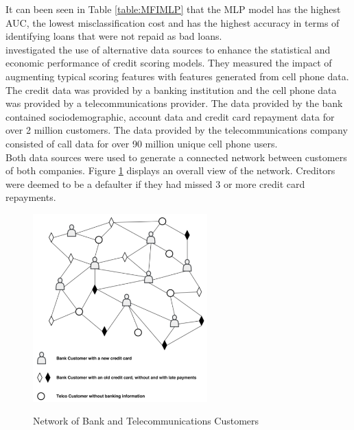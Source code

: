 \vspace{15pt}

It can been seen in Table \ref{table:MFIMLP} that the MLP model has the highest AUC, the lowest misclassification cost and has the highest accuracy in terms of identifying loans that were not repaid as bad loans. \\

\textcite{BigDataMicroFiance} investigated the use of alternative
data sources to enhance the statistical and economic  performance of credit scoring models. They measured the impact of augmenting typical scoring features with features generated from cell phone data. The credit data was provided by a banking institution and the cell phone data was provided by a telecommunications provider. The data provided by the bank contained sociodemographic, account data and credit card repayment data for over 2 million customers. The data provided by the telecommunications company consisted of call data for over 90 million unique cell phone users. \\

Both data sources were used to generate a connected network between customers of both companies. Figure \ref{fig:network} displays an overall view of the network. Creditors were deemed to be a defaulter if they had missed 3 or more credit card repayments. 

\vspace{15pt}

\begin{figure}[!htb]
\centering
\includegraphics[width=0.6\textwidth]{images/network.png}
\caption{Network of Bank and Telecommunications Customers}
\parencite{BigDataMicroFiance}
\label{fig:network}
\end{figure}

